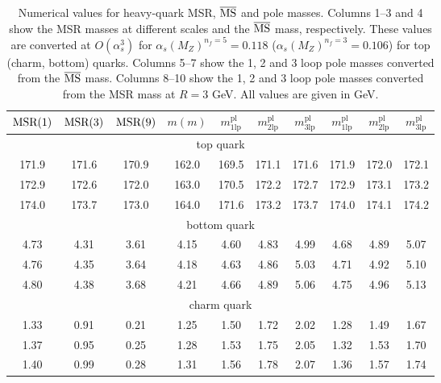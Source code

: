 \documentclass[12pt,a4paper]{article}
\newcommand{\msr}[1]{\ensuremath{\rm MSR(#1)}\xspace}
\newcommand{\msbar}{\ensuremath{\overline{\rm MS}}\xspace}
\begin{document}
\begin{table}
    \begin{tabular}{|ccc|c|ccc|ccc|}
        \hline
        \msr{1} & \msr{3} & \msr{9} & $m(m)$ & $m_{1\text{lp}}^{\text{pl}}$ & $m_{2\text{lp}}^{\text{pl}}$ & $m_{3\text{lp}}^{\text{pl}}$ & $m_{1\text{lp}}^{\text{pl}}$ & $m_{2\text{lp}}^{\text{pl}}$ & $m_{3\text{lp}}^{\text{pl}}$ \\
        \hline
        \multicolumn{10}{|c|}{top quark}\\
        \hline
        171.9 &        171.6 &        170.9 &        162.0 &        169.5 &        171.1 &        171.6 &        171.9 &        172.0 &        172.1 \\ 
        172.9 &        172.6 &        172.0 &        163.0 &        170.5 &        172.2 &        172.7 &        172.9 &        173.1 &        173.2 \\ 
        174.0 &        173.7 &        173.0 &        164.0 &        171.6 &        173.2 &        173.7 &        174.0 &        174.1 &        174.2 \\ 
        \hline
        \multicolumn{10}{|c|}{bottom quark}\\
        \hline
        4.73 &         4.31 &         3.61 &         4.15 &         4.60 &         4.83 &         4.99 &         4.68 &         4.89 &         5.07 \\ 
        4.76 &         4.35 &         3.64 &         4.18 &         4.63 &         4.86 &         5.03 &         4.71 &         4.92 &         5.10 \\ 
        4.80 &         4.38 &         3.68 &         4.21 &         4.66 &         4.89 &         5.06 &         4.75 &         4.96 &         5.13 \\ 
        \hline
        \multicolumn{10}{|c|}{charm quark}\\
        \hline
        1.33 &         0.91 &         0.21 &         1.25 &         1.50 &         1.72 &         2.02 &         1.28 &         1.49 &         1.67 \\ 
        1.37 &         0.95 &         0.25 &         1.28 &         1.53 &         1.75 &         2.05 &         1.32 &         1.53 &         1.70 \\ 
        1.40 &         0.99 &         0.28 &         1.31 &         1.56 &         1.78 &         2.07 &         1.36 &         1.57 &         1.74 \\ 
        \hline
    \end{tabular}
    \caption{Numerical values for heavy-quark MSR, \msbar and pole masses. Columns 1--3 and 4 show the MSR masses at different scales and the \msbar mass, respectively. These values are converted at $O(\alpha_s^3)$ for $\alpha_s(M_Z)^{n_f=5} = 0.118$ ($\alpha_s(M_Z)^{n_f=3} = 0.106$) for top (charm, bottom) quarks. Columns 5--7 show the 1, 2 and 3 loop pole masses converted from the \msbar mass. Columns 8--10 show the 1, 2 and 3 loop pole masses converted from the MSR mass at $R=3$ GeV. All values are given in GeV.}
    \label{tab:masses}
\end{table}
\end{document}
